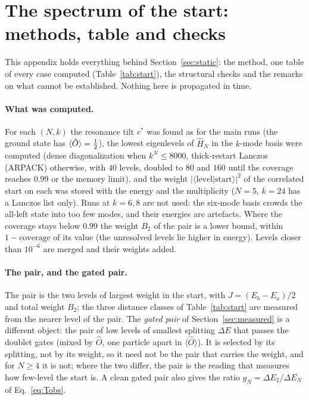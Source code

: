 \section{The spectrum of the start: methods, table and checks}
\label{app:static}

This appendix holds everything behind Section~\ref{sec:static}: the method, one table of every case computed (Table~\ref{tab:start}), the structural checks and the remarks on what cannot be established. Nothing here is propagated in time.

\paragraph{What was computed.} For each $(N,k)$ the resonance tilt $c^\ast$ was found as for the main runs (the ground state has $\langle\hat O\rangle=\frac12$), the lowest eigenlevels of $\hat H_N$ in the $k$-mode basis were computed (dense diagonalization when $k^N\le8000$, thick-restart Lanczos (ARPACK) otherwise, with $40$ levels, doubled to $80$ and $160$ until the coverage reaches $0.99$ or the memory limit), and the weight $|\langle\text{level}|\text{start}\rangle|^2$ of the correlated start on each was stored with the energy and the multiplicity ($N=5$, $k=24$ has a Lanczos list only). Runs at $k=6,8$ are not used: the six-mode basis crowds the all-left state into too few modes, and their energies are artefacts. Where the coverage stays below $0.99$ the weight $B_2$ of the pair is a lower bound, within $1-\text{coverage}$ of its value (the unresolved levels lie higher in energy). Levels closer than $10^{-6}$ are merged and their weights added.

\paragraph{The pair, and the gated pair.} The pair is the two levels of largest weight in the start, with $J=(E_b-E_a)/2$ and total weight $B_2$; the three distance classes of Table~\ref{tab:start} are measured from the nearer level of the pair. The \emph{gated pair} of Section~\ref{sec:measured} is a different object: the pair of low levels of smallest splitting $\Delta E$ that passes the doublet gates (mixed by $\hat O$, one particle apart in $\langle\hat O\rangle$). It is selected by its splitting, not by its weight, so it need not be the pair that carries the weight, and for $N\ge4$ it is not; where the two differ, the pair is the reading that measures how few-level the start is. A clean gated pair also gives the ratio $g_N=\Delta E_2/\Delta E_N$ of Eq.~\eqref{eq:Tobs}.

